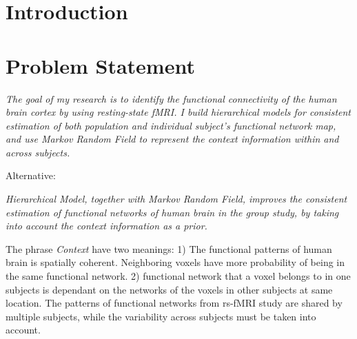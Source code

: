 \documentclass[12pt]{article}
\begin{document}
\section{Introduction}

\section{Problem Statement}

\begin{center}
\parbox{5in}{\emph{The goal of my research is to identify the functional
    connectivity of the human brain cortex by using resting-state fMRI. I build
    hierarchical models for consistent estimation of both population and
    individual subject's functional network map, and use Markov Random Field to
    represent the context information within and across subjects.}}
\end{center}

Alternative:

\begin{center}
\parbox{5in}{\emph{Hierarchical Model, together with Markov Random Field,
    improves the consistent estimation of functional networks of human brain in
    the group study, by taking into account the context information as a prior.}}
\end{center}

\noindent The phrase \emph{Context} have two meanings: 1) The functional patterns of
human brain is spatially coherent. Neighboring voxels have more probability of
being in the same functional network. 2) functional network that a voxel belongs
to in one subjects is dependant on the networks of the  voxels in other subjects at
same location. The patterns of functional networks from rs-fMRI study are shared
by multiple subjects, while the variability across subjects must be taken into
account.
\end{document}
